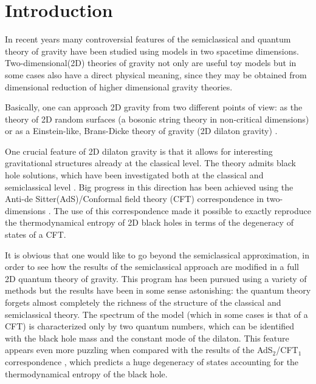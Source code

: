 \documentclass[a4paper,aps,prd,twocolumn,groupedaddress]{revtex4}
\begin{document}
\section{Introduction}
In recent years many controversial features of the semiclassical and quantum 
theory of gravity have been studied using models in two spacetime dimensions.
Two-dimensional(2D) theories of gravity  not only are useful toy models
but in some cases also have a direct physical meaning, since they
may be obtained from dimensional reduction of higher dimensional
gravity theories.

Basically, one can approach 2D gravity from two different points of
view: as the theory of 2D random surfaces (a bosonic string theory in
non-critical dimensions) \cite{pol,kawai} or as a Einstein-like,
Brans-Dicke theory of gravity (2D dilaton gravity) \cite{dilgra,jt}.

One crucial feature of 2D dilaton gravity is that it allows for 
interesting  gravitational structures already at the classical level.
The theory admits black hole solutions, which have been 
investigated both at the classical and semiclassical level 
\cite{kunca}.
Big progress in this direction has been achieved using the Anti-de 
Sitter(AdS)/Conformal field theory (CFT) correspondence in 
two-dimensions \cite{cami,CCKM,cacav,med}.
The use of this correspondence made it possible to exactly reproduce the  
thermodynamical entropy of 2D black holes in terms of the degeneracy 
of states of a CFT. 

It is obvious that one would like to go beyond the semiclassical
approximation, in order to see how the results of the semiclassical
approach are modified in a full 2D quantum theory of gravity.  This
program has been pursued using a variety of methods \cite{jack,CAF}
but the results have been in some sense astonishing: the quantum theory
forgets almost completely the richness of the structure of the
classical and semiclassical theory. The spectrum of the model (which
in some cases is that of a CFT) is characterized only by two quantum
numbers, which can be identified with the black hole mass and the
constant mode of the dilaton.  This feature appears even more puzzling
when compared with the results of the AdS$_{2}$/CFT$_1$ correspondence
\cite{cami}, which predicts a huge degeneracy of states accounting
for the thermodynamical entropy of the black hole.
\end{document}
